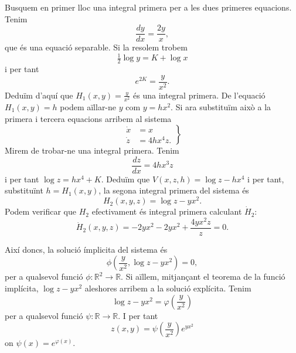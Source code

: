 \documentclass[12pt]{article}
\numberwithin{table}{section}
\numberwithin{equation}{section}
\numberwithin{figure}{section}
\newcommand{\R}{\mathbb{R}}
\begin{document}
Busquem en primer lloc una integral primera per a les dues primeres equacions. Tenim
\begin{equation*}
	\frac{dy}{dx} = \frac{2y}{x},
\end{equation*}
que és una equació separable. Si la resolem trobem
\begin{equation*}
	\tfrac{1}{2}\log{y} = K + \log{x}
\end{equation*}
i per tant
\begin{equation*}
	e^{2K} = \frac{y}{x^2}.
\end{equation*}
Deduïm d'aquí que \( H_1(x,y) = \frac{y}{x^2} \) és una integral primera. De l'equació \( H_1(x,y) = h \) podem aïllar-ne \( y \) com \( y = hx^2 \). Si ara substituïm això a la primera i tercera equacions arribem al sistema
\begin{equation*}
	\left. 	
		\begin{aligned}
			\dot{x} & = x \\
			\dot{z} & = 4hx^4z.
		\end{aligned}
	\right\}
\end{equation*}
Mirem de trobar-ne una integral primera. Tenim
\begin{equation*}
	\frac{dz}{dx} = 4hx^3z
\end{equation*}
i per tant \( \log{z} = hx^4 + K \). Deduïm que \( V(x,z,h) = \log{z} - hx^4 \) i per tant, substituïnt \( h = H_1(x,y) \), la segona integral primera del sistema és
\begin{equation*}
	H_2(x,y,z) = \log{z} - yx^2.
\end{equation*}
Podem verificar que \( H_2 \) efectivament és integral primera calculant \( \dot{H}_2 \):
\begin{equation*}
	\dot{H}_2(x,y,z) = -2yx^2 -2yx^2 + \frac{4yx^2z}{z} = 0.
\end{equation*}

Així doncs, la solució ímplicita del sistema és
\begin{equation*}
	\phi\left(\frac{y}{x^2}, \log{z} - yx^2\right) = 0,
\end{equation*}
per a qualsevol funció \( \phi \colon \R^2 \to \R \). Si aïllem, mitjançant el teorema de la funció implícita, \( \log{z} - yx^2 \) aleshores arribem a la solució explícita. Tenim
\begin{equation*}
	\log{z} - yx^2 = \varphi\left(\frac{y}{x^2}\right)
\end{equation*}
per a qualsevol funció \( \psi \colon \R \to \R \). I per tant
\begin{equation*}
	z(x,y) = \psi\left(\frac{y}{x^2}\right) e^{yx^2}
\end{equation*}
on \( \psi(x) = e^{\varphi(x)} \). 
\end{document}
